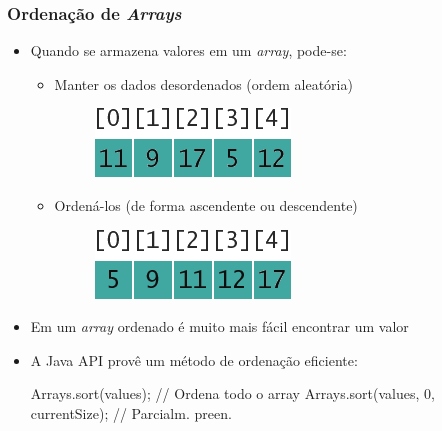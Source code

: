\documentclass[xcolor={dvipsnames,table},aspectratio=169]{beamer}
\begin{document}
\begin{frame}[fragile]\frametitle{Ordenação de \emph{Arrays}}
\begin{itemize}
	\item Quando se armazena valores em um \emph{array}, pode-se:
	\begin{itemize}
		\item Manter os dados desordenados (ordem aleatória)
\begin{figure}[h]
	\includegraphics[height=0.10\paperheight,center]{pucrs-ep-fprog-unidade_06-arrays-laminas-ordenacao_1.png}
\end{figure}
		\item Ordená-los (de forma ascendente ou descendente)
\begin{figure}[h]
	\includegraphics[height=0.10\paperheight,center]{pucrs-ep-fprog-unidade_06-arrays-laminas-ordenacao_2.png}
\end{figure}
	\end{itemize}
	\item Em um \emph{array} ordenado é muito mais fácil encontrar um valor
	\item A Java API provê um método de ordenação eficiente:
{\scriptsize
\begin{javacode}
Arrays.sort(values);      // Ordena todo o array
Arrays.sort(values, 0, currentSize);  // Parcialm. preen.
\end{javacode}
}
\end{itemize}
\end{frame}
\end{document}
